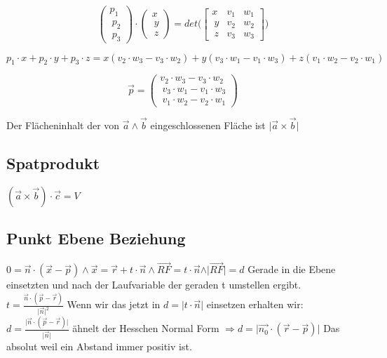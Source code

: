 \documentclass[12pt]{article}
\begin{document}
\begin{equation}
	\begin{pmatrix}
		 p_1 \\\ p_2 \\\ p_3
	\end{pmatrix} \cdot \begin{pmatrix}
		 x \\\ y \\\ z
	\end{pmatrix} = det \Bigg( \begin{bmatrix}
		x & v_1 & w_1 \\\
		y & v_2 & w_2 \\\
		z & v_3 & w_3 
	\end{bmatrix} \Bigg)
\end{equation}

\begin{equation}
	p_1 \cdot x + p_2 \cdot y + p_3 \cdot z = x ( v_2 \cdot w_3 - v_3 \cdot w_2 ) + 
y ( v_3 \cdot w_1 - v_1 \cdot w_3 )
+ z (v_1 \cdot w_2 - v_2 \cdot w_1)
\end{equation}

\begin{equation}
\overrightarrow{p} = \begin{pmatrix}
v_2 \cdot w_3 - v_3 \cdot w_2 \\\
v_3 \cdot w_1 - v_1 \cdot w_3 \\\
v_1 \cdot w_2 - v_2 \cdot w_1
\end{pmatrix}
\end{equation}

Der Flächeninhalt der von \( \overrightarrow{a} \land  \overrightarrow{b} \) eingeschlossenen Fläche ist \( \vert \overrightarrow{a} \times \overrightarrow{b} \vert \)

\subsection*{ Spatprodukt }

\( (\overrightarrow{a} \times \overrightarrow{b}) \cdot \overrightarrow{c} = V \)

\subsection*{ Punkt Ebene Beziehung }

\( 0 = \overrightarrow{n} \cdot (\overrightarrow{x}- \overrightarrow{p}) \land \overrightarrow{x} = \overrightarrow{r} + t \cdot \overrightarrow{n}  \land \overrightarrow{RF} = t \cdot \overrightarrow{n} \land \vert \overrightarrow{RF} \vert = d \)
Gerade in die Ebene einsetzten und nach der Laufvariable der geraden t umstellen ergibt. \( t = \frac{ \overrightarrow{n} \cdot ( \overrightarrow{p} - \overrightarrow{r}) }{ \vert \overrightarrow{n} \vert ^2} \) Wenn wir das jetzt in \( d = \vert t \cdot \overrightarrow{n } \vert \) einsetzen erhalten wir: \( d = \frac{\vert \overrightarrow{n} \cdot ( \overrightarrow{p} - \overrightarrow{r} ) \vert }{\vert \overrightarrow{n} \vert } \) ähnelt der Hesschen Normal Form \( \Rightarrow d = \vert \overrightarrow{n_0} \cdot ( \overrightarrow{r} - \overrightarrow{p} ) \vert \) Das absolut weil ein Abstand immer positiv ist.
\end{document}
